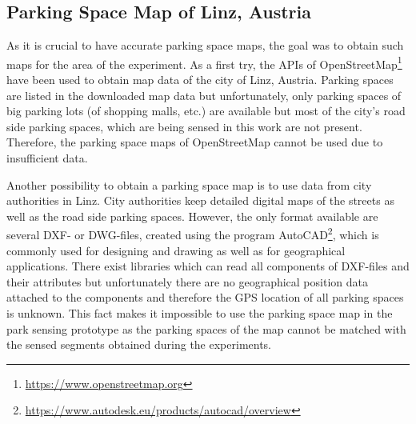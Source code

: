 


\subsection{Parking Space Map of Linz, Austria}
\label{sec:parking_space_map_linz}

As it is crucial to have accurate parking space maps, the goal was to obtain such maps for the area of the experiment. As a first try, the APIs of OpenStreetMap\footnote{\url{https://www.openstreetmap.org}} have been used to obtain map data of the city of Linz, Austria. 
Parking spaces are listed in the downloaded map data but unfortunately, only parking spaces of big parking lots (of shopping malls, etc.) are available but most of the city's road side parking spaces, which are being sensed in this work are not present. Therefore, the parking space maps of OpenStreetMap cannot be used due to insufficient data.

Another possibility to obtain a parking space map is to use data from city authorities in Linz. City authorities keep detailed digital maps of the streets as well as the road side parking spaces. However, the only format available are several DXF- or DWG-files, created using the program AutoCAD\footnote{\url{https://www.autodesk.eu/products/autocad/overview}}, which is commonly used for designing and drawing as well as for geographical applications. There exist libraries which can read all components of DXF-files and their attributes but unfortunately there are no geographical position data attached to the components and therefore the GPS location of all parking spaces is unknown. 
This fact makes it impossible to use the parking space map in the park sensing prototype as the parking spaces of the map cannot be matched with the sensed segments obtained during the experiments.






